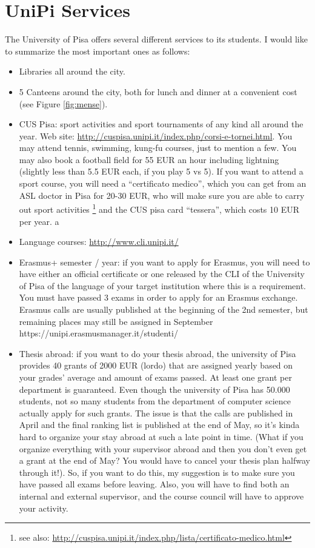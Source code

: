 \documentclass[11pt,fleqn,oneside]{book} %
\begin{document}
\section{UniPi Services}
The University of Pisa offers several different services to its students. I would like to summarize the most important ones as follows:
\begin{itemize}
\item Libraries all around the city.
\item 5 Canteens around the city, both for lunch and dinner at a convenient cost (see Figure \ref{fig:mense}).
\item CUS Pisa: sport activities and sport tournaments of any kind all around the year. Web site: \url{http://cuspisa.unipi.it/index.php/corsi-e-tornei.html}. You may attend tennis, swimming, kung-fu courses, just to mention a few. You may also book a football field for 55 EUR an hour including lightning (slightly less than 5.5 EUR each, if you play 5 vs 5).
If you want to attend a sport course, you will need a “certificato medico”, which you can get from an ASL doctor in Pisa for 20-30 EUR, who will make sure you are able to carry out sport activities \footnote{see also: \url{http://cuspisa.unipi.it/index.php/lista/certificato-medico.html}} and the CUS pisa card “tessera”, which costs 10 EUR per year. a
\item Language courses:  \url{http://www.cli.unipi.it/}
\item Erasmus+ semester / year: if you want to apply for Erasmus, you will need to have either an official certificate or one released by the CLI of the University of Pisa of the language of your target institution where this is a requirement. You must have passed 3 exams in order to apply for an Erasmus exchange. Erasmus calls are usually published at the beginning of the 2nd semester, but remaining places may still be assigned in September https://unipi.erasmusmanager.it/studenti/
\item Thesis abroad: if you want to do your thesis abroad, the university of Pisa provides 40 grants of 2000 EUR (lordo) that are assigned yearly based on your grades’ average and amount of exams passed. At least one grant per department is guaranteed. Even though the university of Pisa has 50.000 students, not so many students from the department of computer science actually apply for such grants. The issue is that the calls are published in April and the final ranking list is published at the end of May, so it’s kinda hard to organize your stay abroad at such a late point in time. (What if you organize everything with your supervisor abroad and then you don’t even get a grant at the end of May? You would have to cancel your thesis plan halfway through it!). So, if you want to do this, my suggestion is to make sure you have passed all exams before leaving.  Also, you will have to find both an internal and external supervisor, and the course council will have to approve your activity. 

\end{itemize}
\end{document}
